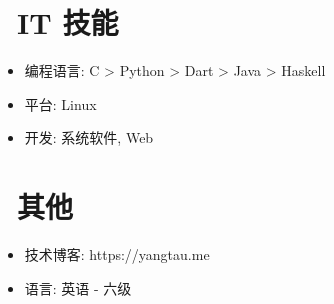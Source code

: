 \documentclass{resume}
\begin{document}

\section{\faCogs\ IT 技能}
\begin{itemize}[parsep=0.5ex]
  \item 编程语言: C > Python > Dart > Java > Haskell
  \item 平台: Linux
  \item 开发: 系统软件, Web 
\end{itemize}


\section{\faInfo\ 其他}
\begin{itemize}[parsep=0.5ex]
  \item 技术博客: https://yangtau.me
  \item 语言: 英语 - 六级
\end{itemize}

%
%
\end{document}
